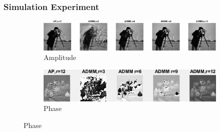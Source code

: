 \documentclass[UTF8]{beamer}
\begin{document}
\begin{frame} \frametitle{Simulation Experiment}


\begin{figure}
\centering
\begin{subfigure}{\textwidth}
    \centering
    \includegraphics[width=0.9\linewidth]{../figures/modes_u.eps}  
   \caption{Amplitude}
    \label{fig:modes_u}
 \end{subfigure}
 \begin{subfigure}{1\textwidth}
    \centering
    \includegraphics[width=.9\linewidth]{../figures/modes_u_phaze.png}  
    \caption{Phase}
    \label{fig:modes_u_phaze}
 \end{subfigure}
 
    \label{fig:modes_images}

 \end{figure}


\end{frame}
\end{document}
